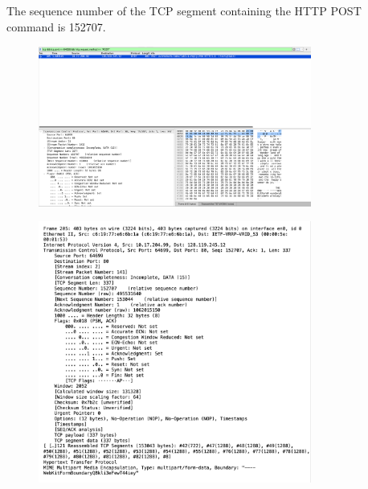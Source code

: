 \documentclass{article}
\begin{document}
\begin{CJK*}{UTF8}{gbsn}
\subsection{}
The sequence number of the TCP segment containing the HTTP POST command is 152707.
\begin{figure}[H]
    \centering
    \includegraphics[width=0.8\textwidth]{6-1.png}
\end{figure}
\begin{figure}[H]
    \centering
    \includegraphics[width=0.8\textwidth]{6-2.png}
\end{figure}

\end{CJK*}
\end{document}
